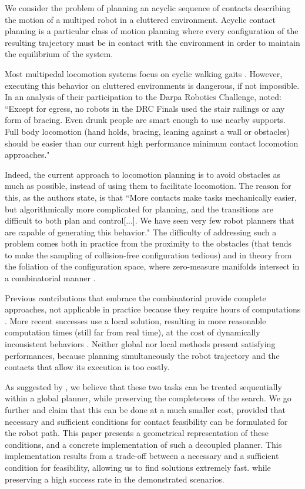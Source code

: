 We consider the problem of planning an acyclic sequence of contacts describing the motion of a multiped robot in a cluttered environment. Acyclic contact planning is a particular class of motion planning where every configuration of the resulting trajectory must be in contact with the environment in order to maintain the equilibrium of the system.

Most multipedal locomotion systems focus on cyclic walking gaits \citep{Kajita03a}. However, executing
this behavior on cluttered environments is dangerous, if not impossible.
In an analysis of their participation to the Darpa Robotics Challenge, \citeauthor{atkensondarpa}
noted: ``Except for egress, no robots in the DRC Finals used
the  stair  railings  or  any  form  of  bracing.   Even  drunk  people  are  smart  enough  to  use  nearby  supports.
Full body locomotion (hand holds,  bracing,  leaning against a wall or obstacles) should be easier than our
current high performance minimum contact locomotion approaches."

Indeed, the current approach to locomotion planning is to avoid obstacles as much as possible, instead of using them
to facilitate locomotion. The reason for this, as the authors state, is that ``More contacts make tasks
mechanically easier, but algorithmically more complicated for planning, and the transitions are difficult to
both plan and control[...].  We have seen very few robot planners that are  capable of  generating this  behavior."
The difficulty of addressing such a problem comes both in practice from the proximity to the obstacles (that tends to make the sampling of collision-free configuration tedious) and in theory from the foliation of the configuration space, where zero-measure manifolds intersect in a combinatorial manner \citep{simeon-manipulation-04}.

Previous contributions that embrace the combinatorial provide complete approaches, not applicable in practice because they require hours of computations \citep{Bretl:2006:MPM:1124573.1124585}.
More recent successes use a local solution, resulting in more reasonable computation times (still far from real time), at the cost of dynamically inconsistent behaviors \citep{Mordatch:2012:DCB:2185520.2185539}.
Neither global nor local methods present satisfying performances, because planning simultaneously the robot trajectory and the contacts that allow
its execution is too costly. 

As suggested by \citeauthor{Bouyarmane2009}, we believe that these two tasks can be treated sequentially within a global planner, while preserving the completeness of the search.
We go further and claim that this can be done at a much smaller cost, provided that necessary and sufficient conditions for contact feasibility can be formulated for the robot path.
This paper presents a geometrical representation of these conditions, and a concrete implementation of such a decoupled planner.
This implementation results from a trade-off between a necessary and a sufficient condition for feasibility, allowing us to find solutions extremely fast.
while preserving a high success rate in the demonstrated scenarios.

